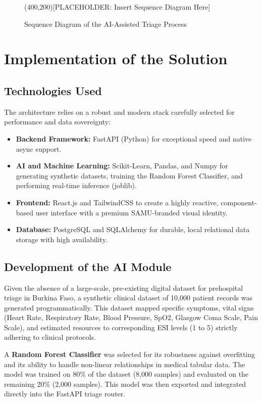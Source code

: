 \documentclass[a4paper,12pt,oneside]{report}
\begin{document}
\begin{figure}[H]
\centering
\framebox(400,200){[PLACEHOLDER: Insert Sequence Diagram Here]}
\caption{Sequence Diagram of the AI-Assisted Triage Process}
\label{fig:sequence}
\end{figure}

\section{Implementation of the Solution}

\subsection{Technologies Used}
The architecture relies on a robust and modern stack carefully selected for performance and data sovereignty:
\begin{itemize}
    \item \textbf{Backend Framework:} FastAPI (Python) for exceptional speed and native async support.
    \item \textbf{AI and Machine Learning:} Scikit-Learn, Pandas, and Numpy for generating synthetic datasets, training the Random Forest Classifier, and performing real-time inference (joblib).
    \item \textbf{Frontend:} React.js and TailwindCSS to create a highly reactive, component-based user interface with a premium SAMU-branded visual identity.
    \item \textbf{Database:} PostgreSQL and SQLAlchemy for durable, local relational data storage with high availability.
\end{itemize}

\subsection{Development of the AI Module}
Given the absence of a large-scale, pre-existing digital dataset for prehospital triage in Burkina Faso, a synthetic clinical dataset of 10,000 patient records was generated programmatically. This dataset mapped specific symptoms, vital signs (Heart Rate, Respiratory Rate, Blood Pressure, SpO2, Glasgow Coma Scale, Pain Scale), and estimated resources to corresponding ESI levels (1 to 5) strictly adhering to clinical protocols.

A \textbf{Random Forest Classifier} was selected for its robustness against overfitting and its ability to handle non-linear relationships in medical tabular data. The model was trained on 80\% of the dataset (8,000 samples) and evaluated on the remaining 20\% (2,000 samples). This model was then exported and integrated directly into the FastAPI triage router.
\end{document}
